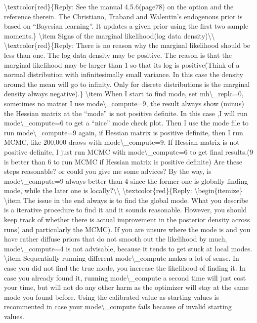 \documentclass[10pt,math=newtx,citestyle=gb7714-2015,bibstyle=gb7714-2015]{elegantbook}
\begin{document}
	\textbackslash{}textcolor\{red\}\{Reply: See the manual 4.5.6(page78) on the option and the reference therein. The Christiano, Traband and Walentin's endogenous prior is based on ``Bayesian learning''. It updates a given prior using the first two sample moments.\}
	\textbackslash{}item Signs of the marginal likelihood(log data density)\textbackslash{}\textbackslash{}
	\textbackslash{}textcolor\{red\}\{Reply: There is no reason why the marginal likelihood should be less than one. The log data density may be positive. The reason is that the marginal likelihood may be larger than 1 so that its log is positive(Think of a normal distribution with infinitesimally small variance. In this case the density around the mean will go to infinity. Only for disrete distributions is the marginal density always negative).\}
	\textbackslash{}item When I start to find mode, set mh\textbackslash{}\_replc=0, sometimes no matter I use mode\textbackslash{}\_compute=9, the result always show (minus) the Hessian matrix at the ``mode'' is not positive definite. In this case ,I will run mode\textbackslash{}\_compute=6 to get a ``nice'' mode check plot. Then I use the mode file to run mode\textbackslash{}\_compute=9 again, if Hessian matrix is positive definite, then I run MCMC, like 200,000 draws with mode\textbackslash{}\_compute=9. If Hessian matrix is not positive definite, I just run MCMC with mode\textbackslash{}\_compute=6 to get final results.(9 is better than 6 to run MCMC if Hessian matrix is positive definite) Are these steps reasonable? or could you give me some advices? By the way, is mode\textbackslash{}\_compute=9 always better than 4 since the former one is globally finding mode, while the later one is locally?\textbackslash{}\textbackslash{}
	\textbackslash{}textcolor\{red\}\{Reply:
	\textbackslash{}begin\{itemize\}
	\textbackslash{}item The issue in the end always is to find the global mode. What you describe is a iterative procedure to find it and it sounds reasonable. However, you should keep track of whether there is actual improvement in the posterior density across runs( and particularly the MCMC). If you are unsure where the mode is and you have rather diffuse priors that do not smooth out the likelihood by much, mode\textbackslash{}\_compute=4 is not advisable, because it tends to get stuck at local modes.
	\textbackslash{}item Sequentially running different mode\textbackslash{}\_compute makes a lot of sense. In case you did not find the true mode, you increase the likelihood of finding it. In case you already found it, running mode\textbackslash{}\_compute a second time will just cost your time, but will not do any other harm as the optimizer will stay at the same mode you found before. Using the calibrated value as starting values is recommented in case your mode\textbackslash{}\_compute fails because of invalid starting values.
\end{document}
